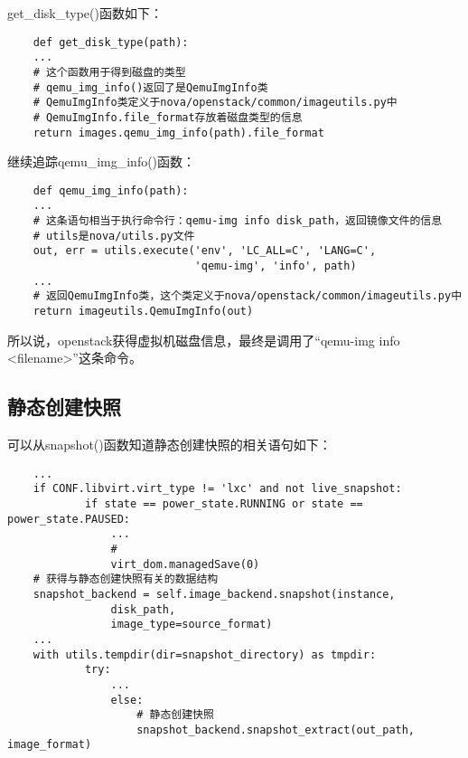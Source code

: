\documentclass[a4paper,left=1.5cm,right=1.5cm,11pt]{article}
\begin{document}
	get\_disk\_type()函数如下：
	\begin{lstlisting}
	def get_disk_type(path):
    ...
	# 这个函数用于得到磁盘的类型
	# qemu_img_info()返回了是QemuImgInfo类
	# QemuImgInfo类定义于nova/openstack/common/imageutils.py中
	# QemuImgInfo.file_format存放着磁盘类型的信息
    return images.qemu_img_info(path).file_format
	\end{lstlisting}

	继续追踪qemu\_img\_info()函数：
	\begin{lstlisting}
	def qemu_img_info(path):
    ...
	# 这条语句相当于执行命令行：qemu-img info disk_path，返回镜像文件的信息
	# utils是nova/utils.py文件
    out, err = utils.execute('env', 'LC_ALL=C', 'LANG=C',
                             'qemu-img', 'info', path)
    ...
	# 返回QemuImgInfo类，这个类定义于nova/openstack/common/imageutils.py中
    return imageutils.QemuImgInfo(out)
	\end{lstlisting}

	所以说，openstack获得虚拟机磁盘信息，最终是调用了“qemu-img info <filename>”这条命令。

\subsection{静态创建快照}
	可以从snapshot()函数知道静态创建快照的相关语句如下：
	\begin{lstlisting}
	...
	if CONF.libvirt.virt_type != 'lxc' and not live_snapshot:
            if state == power_state.RUNNING or state == power_state.PAUSED:
                ...
				# 
                virt_dom.managedSave(0)
	# 获得与静态创建快照有关的数据结构
	snapshot_backend = self.image_backend.snapshot(instance,
                disk_path,
                image_type=source_format)
	...
	with utils.tempdir(dir=snapshot_directory) as tmpdir:
            try:
				...
                else:
					# 静态创建快照
                    snapshot_backend.snapshot_extract(out_path, image_format)
	\end{lstlisting}

\clearpage
\end{document}
